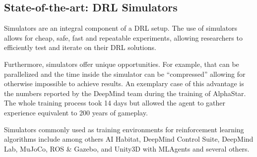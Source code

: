 

\subsection{State-of-the-art: DRL Simulators}

\begin{textblock}
Simulators are an integral component of a DRL setup. The use of simulators allows for cheap, safe, fast and repeatable experiments, allowing researchers to efficiently test and iterate on their DRL solutions.

Furthermore, simulators offer unique opportunities. For example, that can be parallelized and the time inside the simulator can be “compressed” allowing for otherwise impossible to achieve results. An exemplary case of this advantage is the numbers reported by the DeepMind team during the training of AlphaStar. The whole training process took 14 days but allowed the agent to gather experience equivalent to 200 years of gameplay.\cite{alphastar2019}

Simulators commonly used as training environments for reinforcement learning algorithms include among others AI Habitat, DeepMind Control Suite, DeepMind Lab, MuJoCo, ROS \& Gazebo, and Unity3D with MLAgents and several others.\cite{neptuneai2023}

\end{textblock}

